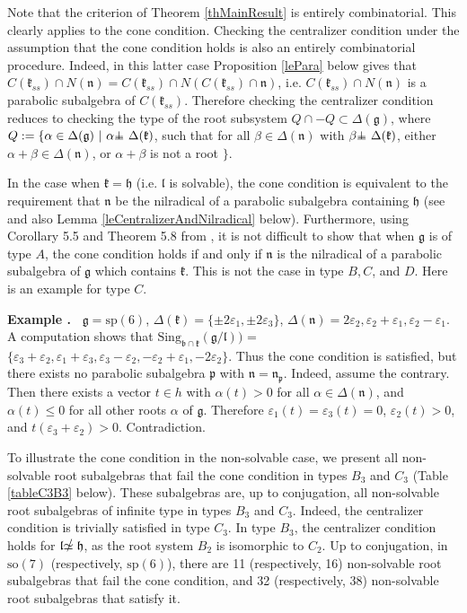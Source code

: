 \documentclass[12pt]{report}
\newenvironment{example}{ \smallskip \addtocounter{theo}{1} \noindent \textbf{Example  \arabic{section}.\arabic{theo}~}}{}%
\newcommand{\kk}{\mathfrak{k}}
\newcommand{\nn}{\mathfrak{n}}
\newcommand{\hh}{\mathfrak{h}}
\newcommand{\pp}{\mathfrak{p}}
\newcommand{\gG}{\mathfrak{g}}
\newcommand{\bb}{\mathfrak{b}}
\newcommand{\lL}{\mathfrak{l}}
\newcommand{\sP}{\mathrm{sp}}
\newcommand{\so}{\mathrm{so}}
\newcommand{\hw}{\mathrm{Sing}}
\newcommand{\eps}{\varepsilon}
\def\sperp{{\hbox{$\perp${\hbox{\kern -.77em $-$}\raise-1pt\hbox{\kern -.77em $-$}}\ }}}
\def\nsimeq{\hbox{$\simeq${\raise1.05pt\hbox{\kern -0.55em $/$}}\ }}
\newcommand{\pma}{\pm}%
\newcommand{\arxivVersion}[1]{#1}
\begin{document}
Note that the criterion of Theorem \ref{thMainResult} is entirely combinatorial. This clearly applies to the cone condition. Checking the centralizer condition under the assumption that the cone condition holds is also an entirely combinatorial procedure. Indeed, in this latter case Proposition \ref{lePara} below gives that $ C(\kk_{ss})\cap N(\nn)= C(\kk_{ss}) \cap N(C(\kk_{ss})\cap\nn)$, i.e. $ C(\kk_{ss})\cap N(\nn)$ is a parabolic subalgebra of $C(\kk_{ss})$. Therefore checking the centralizer condition reduces to checking the type of the root subsystem $Q\cap -Q\subset\Delta(\gG)$, where $Q:=\{\alpha\in\Delta(\gG)~|~\alpha\sperp \Delta(\kk)$, such that for all $\beta\in\Delta(\nn)$ with $\beta\sperp\Delta(\kk)$, either $\alpha+\beta\in\Delta(\nn)$, or $\alpha+\beta$ is not a root $\}$. 


In the case when $\kk=\hh$ (i.e. $\lL$ is solvable), the cone condition is equivalent to the requirement that $\nn$ be the nilradical of a parabolic subalgebra containing $\hh$ (see \cite[Prop. 4]{PS:GenHarishChandra} and also Lemma \ref{leCentralizerAndNilradical} below). Furthermore, using Corollary 5.5 and Theorem 5.8 from \cite{PSZ}, it is not difficult to show that when $\gG$ is of type $A$, the cone condition holds if and only if $\nn$ is the nilradical of a parabolic subalgebra of $\gG$ which contains $\kk$. This is not the case in type $B,C$, and $D$. Here is an example for type $C$.

\begin{example}\label{exsp6} $\gG=\sP(6)$, $\Delta(\kk)=\{\pma2\eps_1,\pma2\eps_3\}$, $\Delta(\nn)=2\eps_2, \eps_2+ \eps_1, \eps_2- \eps_1 $.  A computation shows that $\hw_{ \bb\cap\kk } (\gG/\lL))$ = $\{\eps_3+ \eps_2,\eps_1+ \eps_3, \eps_3- \eps_2, -\eps_2+ \eps_1,-2\eps_2\}$. Thus the cone condition is satisfied, but there exists no parabolic subalgebra $\pp$ with $\nn=\nn_\pp$. Indeed, assume the contrary. Then there exists a vector $t\in h$ with $\alpha(t)>0$ for all $\alpha \in \Delta (\nn)$, and $\alpha(t)\leq 0$ for all other roots $\alpha$ of $\gG$. Therefore $\eps_1(t)=\eps_3(t)=0$,  $\eps_2(t)>0$, and $t(\eps_3+\eps_2)>0$. Contradiction.
\end{example}

To illustrate the cone condition in the non-solvable case, we present all non-solvable root subalgebras that fail the cone condition in types $B_3$ and $C_3$ (Table \ref{tableC3B3} below). These subalgebras are, up to conjugation, all non-solvable root subalgebras of infinite type in types $B_3$ and $C_3$. Indeed, the centralizer condition is trivially satisfied in type $C_3$. In type $B_3$, the centralizer condition holds for $\lL\nsimeq \hh$, as the root system $B_2$ is isomorphic to $C_2$. Up to conjugation, in $\so(7)$ (respectively, $\sP(6)$), there are 11 (respectively, 16) non-solvable root subalgebras that fail the cone condition, and 32 (respectively, 38) non-solvable root subalgebras that satisfy it. %
\end{document}
